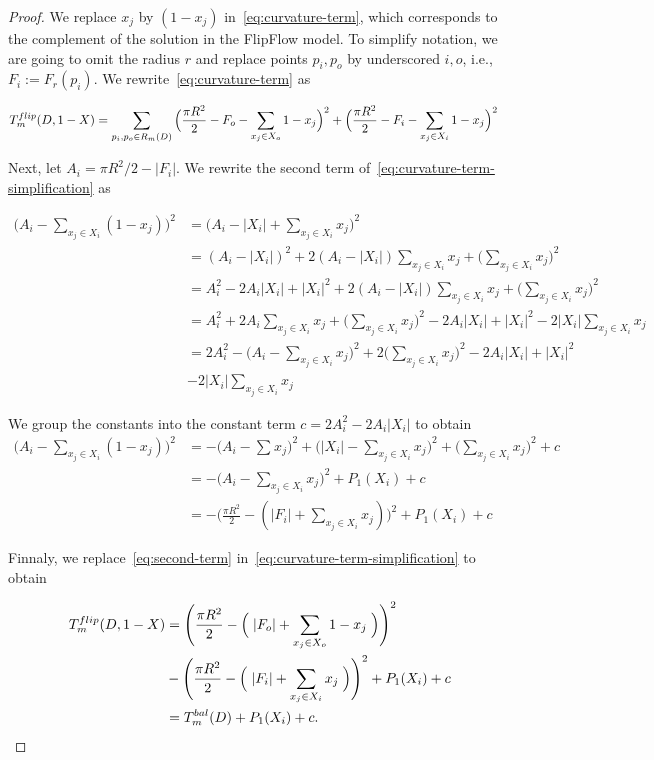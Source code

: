 \begin{proof}

We replace $x_j$ by $(1-x_j)$ in~\cref{eq:curvature-term}, which corresponds to the complement of the solution in the FlipFlow model. To simplify notation, we are going to omit the radius $r$ and replace points $p_i,p_o$ by underscored $i,o$, i.e., $F_i := F_r(p_i)$. We rewrite~\cref{eq:curvature-term} as

\begin{align}
T_{m}^{flip}(D,1-X) &= \sum_{ p_i,p_o \in R_m(D)}{ \Big( \frac{\pi R^2}{2} - F_o - \sum_{x_j \in X_o}{1-x_j}\Big)^2 + \Big(\frac{\pi R^2}{2} - F_i - \sum_{x_j \in X_i}{1-x_j}\Big)^2 }
\label{eq:curvature-term-simplification}
\end{align}

Next, let $A_i = \pi R^2/2 - |F_i|$. We rewrite  the second term of~\cref{eq:curvature-term-simplification} as

\begin{align*}
	\Big(A_i - \sum_{x_j \in X_i}{ (1-x_j) } \Big)^2 &= \Big( A_i - |X_i| + \sum_{x_j \in X_i}{ x_j } \Big)^2 \\
	&= (A_i - |X_i|)^2 + 2(A_i - |X_i|)\sum_{x_j \in X_i}{x_j} + \Big( \sum_{x_j \in X_i}{x_j} \Big)^2\\	
	&= A_i^2 -2A_i|X_i| + |X_i|^2 + 2(A_i - |X_i|)\sum_{x_j \in X_i}{x_j} + \Big( \sum_{x_j \in X_i}{x_j} \Big)^2\\
	&= A_i^2 + 2A_i\sum_{x_j \in X_i}{x_j} + \Big( \sum_{x_j \in X_i}{x_j} \Big)^2 - 2A_i|X_i| + |X_i|^2 -2|X_i|\sum_{x_j \in X_i}{x_j} \\
	&= 2A_i^2 - \Big(A_i - \sum_{x_j \in X_i}{x_j}\Big)^2 + 2\Big( \sum_{x_j \in X_i}{x_j} \Big) ^2 - 2A_i|X_i| + |X_i|^2 \nonumber \\
	& - 2|X_i|\sum_{x_j \in X_i}{x_j}
\end{align*}

	We group the constants into the constant term $c=2A_i^2 - 2A_i|X_i|$	 to obtain
\begin{align}
		\Big(A_i - \sum_{x_j \in X_i}{ (1-x_j) }\Big)^2 &= - \Big(A_i - \sum_{}{x_j}\Big)^2 + \Big(|X_i| - \sum_{x_j \in X_i}{x_j}\Big)^2 + \Big(\sum_{x_j \in X_i}{x_j}\Big)^2 + c \nonumber \\
	&= - \Big(A_i - \sum_{x_j \in X_i}{x_j}\Big)^2 + P_1(X_i) + c \nonumber \\
	&= - \Big(\frac{\pi R^2}{2} - (|F_i| + \sum_{x_j \in X_i}{x_j}) \Big)^2 + P_1(X_i) + c \nonumber 	
	\label{eq:second-term}
\end{align}

Finnaly, we  replace~\cref{eq:second-term} in~\cref{eq:curvature-term-simplification} to obtain

\begin{align}
T_{m}^{flip}(D,1-X) &= \Bigg( \frac{\pi R^2}{2} - \Big(\; |F_o| + \sum_{ x_j \in X_o}{1-x_j} \; \Big) \Bigg)^2 \nonumber \\
& - \Bigg(\frac{\pi R^2}{2} - \Big(\; |F_i| + \sum_{x_j \in X_i}{x_j}\;\Big) \Bigg)^2  + P_1(X_i) + c \nonumber \\
&= T_{m}^{bal}(D) + P_1(X_i) + c.
\end{align}

\end{proof}

